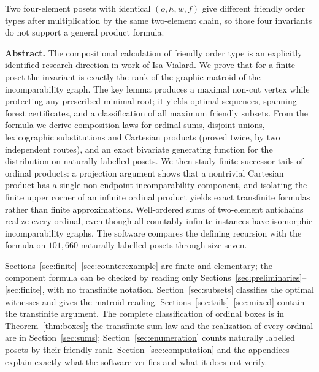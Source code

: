 \documentclass[11pt,letterpaper]{article}
\theoremstyle{definition}
\theoremstyle{remark}
\begin{document}
\begin{titlepage}
\begin{resultbox}[title={\bfseries Main conclusions}]
Two four-element posets with identical $(o,h,w,f)$ give different friendly
order types after multiplication by the same two-element chain, so those four
invariants do not support a general product formula.
\end{resultbox}
\vspace{.10in}
\footnotesize
\noindent\textbf{Abstract.}
The compositional calculation of friendly order type is an explicitly
identified research direction in work of Isa Vialard. We prove that for a
finite poset the invariant is exactly the rank of the graphic matroid of the
incomparability graph. The key lemma produces a maximal non-cut vertex while
protecting any prescribed minimal root; it yields optimal sequences,
spanning-forest certificates, and a classification of all maximum friendly
subsets. From the formula we derive composition laws for ordinal sums,
disjoint unions, lexicographic substitutions and Cartesian products (proved
twice, by two independent routes), and an exact bivariate generating function
for the distribution on naturally labelled posets. We then study finite
successor tails of ordinal products: a projection argument shows that a
nontrivial Cartesian product has a single non-endpoint incomparability
component, and isolating the finite upper corner of an infinite ordinal
product yields exact transfinite formulas rather than finite approximations.
Well-ordered sums of two-element antichains realize every ordinal, even
though all countably infinite instances have isomorphic incomparability
graphs. The software compares the defining recursion with the formula on
$101{,}660$ naturally labelled posets through size seven.
\vfill
\end{titlepage}

\tableofcontents
\vspace{1em}
\begin{resultbox}[title={\bfseries Reading guide}]
Sections~\ref{sec:finite}--\ref{sec:counterexample} are finite and elementary;
the component formula can be checked by reading only
Sections~\ref{sec:preliminaries}--\ref{sec:finite}, with no transfinite
notation. Section~\ref{sec:subsets} classifies the optimal witnesses and
gives the matroid reading. Sections~\ref{sec:tails}--\ref{sec:mixed} contain
the transfinite argument. The complete classification of ordinal boxes is in
Theorem~\ref{thm:boxes}; the transfinite sum law and the realization of every
ordinal are in Section~\ref{sec:sums}; Section~\ref{sec:enumeration} counts
naturally labelled posets by their friendly rank.
Section~\ref{sec:computation} and the appendices explain exactly what the
software verifies and what it does not verify.
\end{resultbox}
\end{document}
